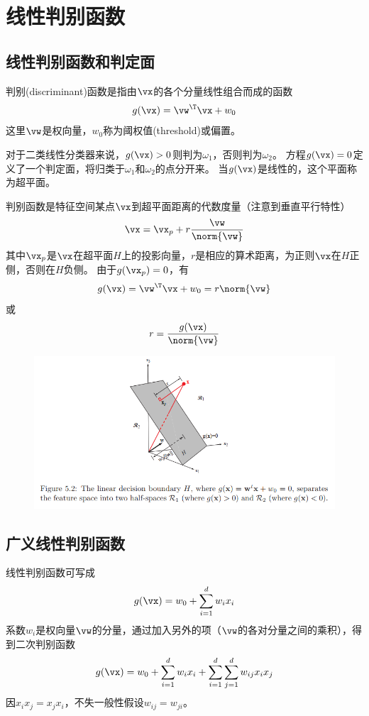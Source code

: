 
\section{线性判别函数} %

\subsection{线性判别函数和判定面}
判别(discriminant)函数是指由$\vx$的各个分量线性组合而成的函数
\[g(\vx)=\vw^\T\vx+w_0\]
这里$\vw$是权向量，$w_0$称为阈权值(threshold)或偏置。

对于二类线性分类器来说，$g(\vx)>0$则判为$\omega_1$，否则判为$\omega_2$。
方程$g(\vx)=0$定义了一个判定面，将归类于$\omega_1$和$\omega_2$的点分开来。
当$g(\vx)$是线性的，这个平面称为超平面。

判别函数是特征空间某点$\vx$到超平面距离的代数度量（注意到垂直平行特性）
\[\vx=\vx_p+r\frac{\vw}{\norm{\vw}}\]
其中$\vx_p$是$\vx$在超平面$H$上的投影向量，$r$是相应的算术距离，为正则$\vx$在$H$正侧，否则在$H$负侧。
由于$g(\vx_p)=0$，有
\[g(\vx)=\vw^\T\vx+w_0=r\norm{\vw}\]
或
\[r=\frac{g(\vx)}{\norm{\vw}}\]
\begin{figure}[H]
\centering
\includegraphics[width=0.9\linewidth]{fig/linear_decision_boundary.png}
\end{figure}

\subsection{广义线性判别函数}
线性判别函数可写成
\[g(\vx)=w_0+\sum_{i=1}^d w_i x_i\]
系数$w_i$是权向量$\vw$的分量，通过加入另外的项（$\vw$的各对分量之间的乘积），得到二次判别函数
\[g(\vx)=w_0+\sum_{i=1}^d w_ix_i+\sum_{i=1}^d\sum_{j=1}^d w_{ij}x_ix_j\]
因$x_ix_j=x_jx_i$，不失一般性假设$w_{ij}=w_{ji}$。

